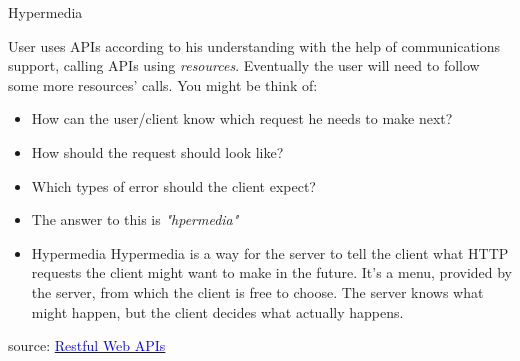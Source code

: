 \documentclass{beamer}
\begin{document}
\begin{frame}[t]{Hypermedia}
		
		User uses APIs according to his understanding with the help of communications support, calling APIs using \textit{resources}. Eventually the user will need to follow some more resources' calls. You might be think of:
		
		\scriptsize		
		\begin{itemize}
			\item<1-> How can the user/client know which request he needs to make next?
			\item<2-> How should the request should look like?
			\item<3-> Which types of error should the client expect?
			
			\item<4->[] \normalsize The answer to this is \textit{"hpermedia"}
			
			\item<5->[] 
				\small
				\begin{block}{Hypermedia}
					Hypermedia is a way for the server to tell the client what HTTP requests the client might want to make in the future. It’s a menu, provided by the server, from which the client is free to choose. The server knows what might happen, but the client decides what actually happens.
				\end{block}
		\end{itemize}		

\tiny source: \href{https://www.oreilly.com/library/view/restful-web-apis/9781449359713/} {\textcolor{blue}{Restful Web APIs}} 	
\end{frame}
\end{document}
